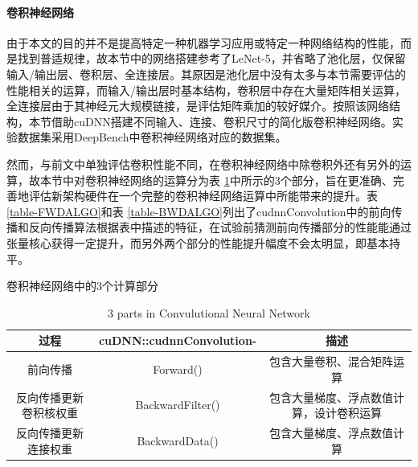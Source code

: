 \paragraph{卷积神经网络}
\par 由于本文的目的并不是提高特定一种机器学习应用或特定一种网络结构的性能，而是找到普适规律，故本节中的网络搭建参考了LeNet-5，并省略了池化层，仅保留输入/输出层、卷积层、全连接层。其原因是池化层中没有太多与本节需要评估的性能相关的运算，而输入/输出层时基本结构，卷积层中存在大量矩阵相关运算，全连接层由于其神经元大规模链接，是评估矩阵乘加的较好媒介。按照该网络结构，本节借助cuDNN搭建不同输入、连接、卷积尺寸的简化版卷积神经网络。实验数据集采用DeepBench中卷积神经网络对应的数据集。
\par 然而，与前文中单独评估卷积性能不同，在卷积神经网络中除卷积外还有另外的运算，故本节中对卷积神经网络的运算分为表 \ref{table-CONVSTEP}中所示的3个部分，旨在更准确、完善地评估新架构硬件在一个完整的卷积神经网络运算中所能带来的提升。表 \ref{table-FWDALGO}和表 \ref{table-BWDALGO}列出了cudnnConvolution中的前向传播和反向传播算法根据表中描述的特征，在试验前猜测前向传播部分的性能能通过张量核心获得一定提升，而另外两个部分的性能提升幅度不会太明显，即基本持平。
\begin{table}
	\centering
	\renewcommand{\thetable}{\arabic{section}-\arabic{table} }
	\renewcommand{\tablename}{表}
	\caption{卷积神经网络中的3个计算部分}
	\addtocounter{table}{-1}
	\renewcommand{\thetable}{\arabic{section}-\arabic{table} }
	\renewcommand{\tablename}{Table}
	\caption{3 parts in Convulutional Neural Network}
	\begin{tabular}{ccc}
		\toprule
		过程 & cuDNN::cudnnConvolution-	&	描述\\
		\midrule
		前向传播 & Forward() & 包含大量卷积、混合矩阵运算 \\
		反向传播更新卷积核权重 & BackwardFilter() & 包含大量梯度、浮点数值计算，设计卷积运算\\
		反向传播更新连接权重 & BackwardData() & 包含大量梯度、浮点数值计算\\
		\bottomrule
	\end{tabular} \label{table-CONVSTEP} 
\end{table}
